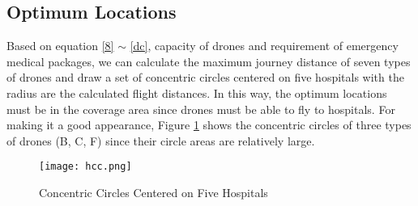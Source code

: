 \documentclass{mcmthesis}
\begin{document}
    \subsection{Optimum Locations}
    Based on equation \ref{8} $\sim$ \ref{dc}, capacity of drones and requirement of emergency medical packages, we can calculate the maximum journey distance of seven types of drones and draw a set of concentric circles centered on five hospitals with the radius are the calculated flight distances. In this way, the optimum locations must be in the coverage area since drones must be able to fly to hospitals. For making it a good appearance, Figure \ref{hcc} shows the concentric circles of three types of drones (B, C, F) since their circle areas are relatively large.  
      \begin{figure}[H]                                         
    	\centering
    	\texttt{[image: hcc.png]}        
    	\caption{Concentric Circles Centered on Five Hospitals}                           
    	\label{hcc}                                          
    \end{figure}
\end{document}
